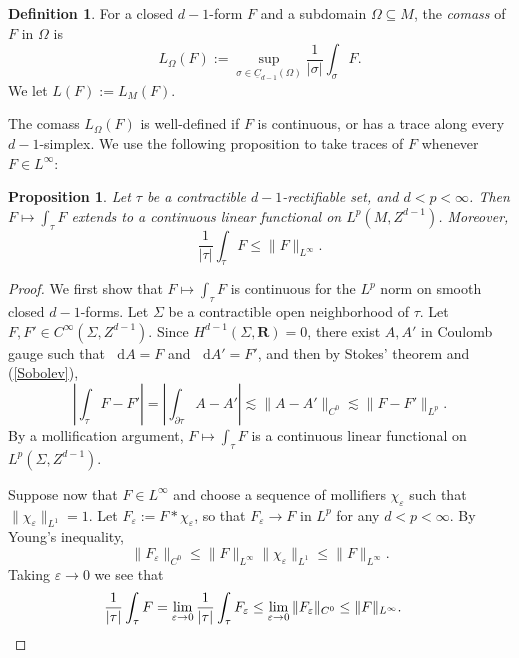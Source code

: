 \documentclass[reqno,11pt]{amsart}
\newcommand{\RR}{\mathbf{R}}
\newcommand*\dif{\mathop{}\!\mathrm{d}}
\newcommand{\Chain}{\underline C}
\newcommand{\dfn}[1]{\emph{#1}\index{#1}}
\newtheorem{proposition}[theorem]{Proposition}
\theoremstyle{definition}
\newtheorem{definition}[theorem]{Definition}
\numberwithin{equation}{section}
\begin{document}
\begin{definition}
For a closed $d-1$-form $F$ and a subdomain $\Omega \subseteq M$, the \dfn{comass} of $F$ in $\Omega$ is
$$L_\Omega(F) := \sup_{\sigma \in \Chain_{d - 1}(\Omega)} \frac{1}{|\sigma|} \int_\sigma F.$$
We let $L(F) := L_M(F)$.
\end{definition}

The comass $L_\Omega(F)$ is well-defined if $F$ is continuous, or has a trace along every $d - 1$-simplex.
We use the following proposition to take traces of $F$ whenever $F \in L^\infty$:

\begin{proposition}\label{integration is welldefined}
Let $\tau$ be a contractible $d-1$-rectifiable set, and $d < p < \infty$.
Then $F \mapsto \int_\tau F$ extends to a continuous linear functional on $L^p(M, Z^{d - 1})$.
Moreover,
\begin{equation}\label{integral over chain is linfinity}
	\frac{1}{|\tau|} \int_\tau F \leq \|F\|_{L^\infty}.
\end{equation}
\end{proposition}
\begin{proof}
We first show that $F \mapsto \int_\tau F$ is continuous for the $L^p$ norm on smooth closed $d-1$-forms.
Let $\Sigma$ be a contractible open neighborhood of $\tau$.
Let $F, F' \in C^\infty(\Sigma, Z^{d - 1})$.
Since $H^{d - 1}(\Sigma, \RR) = 0$, there exist $A, A'$ in Coulomb gauge such that $\dif A = F$ and $\dif A' = F'$, and then by Stokes' theorem and (\ref{Sobolev}),
$$\left|\int_\tau F - F'\right| = \left|\int_{\partial \tau} A - A'\right| \lesssim \|A - A'\|_{C^0} \lesssim \|F - F'\|_{L^p}.$$
By a mollification argument, $F \mapsto \int_\tau F$ is a continuous linear functional on $L^p(\Sigma, Z^{d - 1})$.

Suppose now that $F \in L^\infty$ and choose a sequence of mollifiers $\chi_\varepsilon$ such that $\|\chi_\varepsilon\|_{L^1} = 1$.
Let $F_\varepsilon := F * \chi_\varepsilon$, so that $F_\varepsilon \to F$ in $L^p$ for any $d < p < \infty$.
By Young's inequality, 
$$\|F_\varepsilon\|_{C^0} \leq \|F\|_{L^\infty} \|\chi_\varepsilon\|_{L^1} \leq \|F\|_{L^\infty}.$$
Taking $\varepsilon \to 0$ we see that
\begin{align*}
\frac{1}{|\tau|} \int_\tau F 
&= \lim_{\varepsilon \to 0} \frac{1}{|\tau|} \int_\tau F_\varepsilon \leq \lim_{\varepsilon \to 0} \|F_\varepsilon\|_{C^0} \leq \|F\|_{L^\infty}. \qedhere
\end{align*}
\end{proof}
\end{document}
